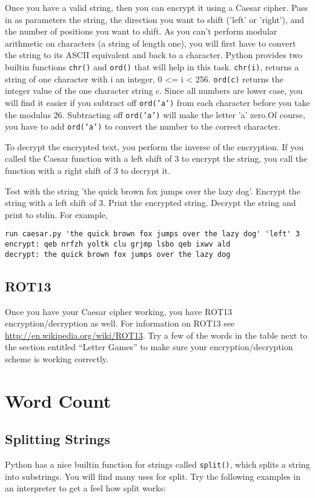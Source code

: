 \documentclass[12pt]{article}
\begin{document}
\begin{enumerate}
  Once you have a valid string, then you can encrypt it using a Caesar cipher. Pass in as parameters the string, the direction you want to shift ('left' or 'right'), and the number of positions you want to shift. As you can't perform modular arithmetic on characters (a string of length one), you will first have to convert the string to its ASCII equivalent and back to a character. Python provides two builtin functions \texttt{chr()} and \texttt{ord()} that will help in this task. \texttt{chr(i)}, returns a string of one character with i an integer, 0 <= i < 256. \texttt{ord(c)} returns the integer value of the one character string c. Since all numbers are lower case, you will find it easier if you subtract off \texttt{ord('a')} from each character before you take the modulus 26. Subtracting off \texttt{ord('a')} will make the letter 'a' zero.Of course, you have to add \texttt{ord('a')} to convert the number to the correct character.

To decrypt the encrypted text, you perform the inverse of the encryption. If you called the Caesar function with a left shift of 3 to encrypt the string, you call the function with a right shift of 3 to decrypt it. 

Test with the string 'the quick brown fox jumps over the lazy dog'. Encrypt the string with a left shift of 3. Print the encrypted string. Decrypt the string and print to stdin. For example, 

\begin{verbatim}
run caesar.py 'the quick brown fox jumps over the lazy dog' 'left' 3
encrypt: qeb nrfzh yoltk clu grjmp lsbo qeb ixwv ald
decrypt: the quick brown fox jumps over the lazy dog
\end{verbatim}

\subsection*{ROT13}
Once you have your Caesar cipher working, you have ROT13 encryption/decryption as well. For information on ROT13 see \url{http://en.wikipedia.org/wiki/ROT13}. Try a few of the words in the table next to the section entitled ``Letter Games'' to make sure your encryption/decryption scheme is working correctly.


\section*{Word Count}

\subsection*{Splitting Strings}
Python has a nice builtin function for strings called \texttt{split()}, which splits a string into substrings. You will find many uses for split. Try the following examples in an interpreter to get a feel how split works:


\end{enumerate}
\end{document}
